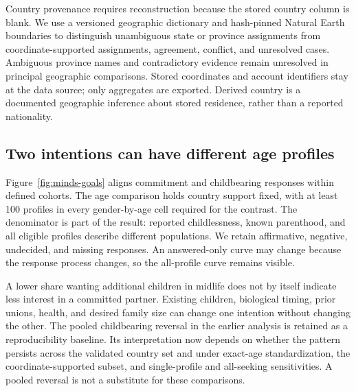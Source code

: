Country provenance requires reconstruction because the stored country column is blank. We use a versioned geographic dictionary and hash-pinned Natural Earth boundaries to distinguish unambiguous state or province assignments from coordinate-supported assignments, agreement, conflict, and unresolved cases. Ambiguous province names and contradictory evidence remain unresolved in principal geographic comparisons. Stored coordinates and account identifiers stay at the data source; only aggregates are exported. Derived country is a documented geographic inference about stored residence, rather than a reported nationality.



\subsection{Two intentions can have different age profiles}

Figure~\ref{fig:minds-goals} aligns commitment and childbearing responses within defined cohorts. The age comparison holds country support fixed, with at least 100 profiles in every gender-by-age cell required for the contrast. The denominator is part of the result: reported childlessness, known parenthood, and all eligible profiles describe different populations. We retain affirmative, negative, undecided, and missing responses. An answered-only curve may change because the response process changes, so the all-profile curve remains visible.


A lower share wanting additional children in midlife does not by itself indicate less interest in a committed partner. Existing children, biological timing, prior unions, health, and desired family size can change one intention without changing the other. The pooled childbearing reversal in the earlier analysis is retained as a reproducibility baseline. Its interpretation now depends on whether the pattern persists across the validated country set and under exact-age standardization, the coordinate-supported subset, and single-profile and all-seeking sensitivities. A pooled reversal is not a substitute for these comparisons.

